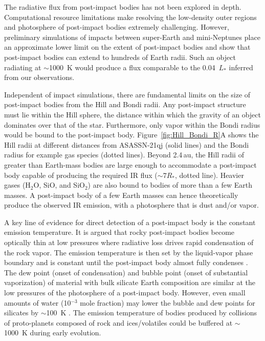 \documentclass[sn-nature]{sn-jnl}%
\begin{document}



The radiative flux from post-impact bodies has not been explored in depth.
%
Computational resource limitations make resolving the low-density outer regions and photosphere of post-impact bodies extremely challenging.
%
However, preliminary simulations of impacts between super-Earth and mini-Neptunes place an approximate lower limit on the extent of post-impact bodies and show that post-impact bodies can extend to hundreds of Earth radii.
%
Such an object radiating at $\sim$1000~K would produce a flux comparable to the 0.04~$L_*$ inferred from our observations. 

Independent of impact simulations, there are fundamental limits on the size of post-impact bodies from the Hill and Bondi radii.
%
Any post-impact structure must lie within the Hill sphere, the distance within which the gravity of an object dominates over that of the star.
%
Furthermore, only vapor within the Bondi radius would be bound to the post-impact body.
%
Figure~\ref{fig:Hill_Bondi_R}A shows the Hill radii at different distances from ASASSN-21qj (solid lines) and the Bondi radius for example gas species (dotted lines).
%
Beyond 2.4\,au, the Hill radii of greater than Earth-mass bodies are large enough to accommodate a post-impact body capable of producing the required IR flux ($\sim7R_*$, dotted line). 
%
Heavier gases (H$_2$O, SiO, and SiO$_2$) are also bound to bodies of more than a few Earth masses.
%
A post-impact body of a few Earth masses can hence theoretically produce the observed IR emission, with a photosphere that is dust and/or vapor.



A key line of evidence for direct detection of a post-impact body is the constant emission temperature.
%
It is argued \cite{Lock18} that rocky post-impact bodies become optically thin at low pressures where radiative loss drives rapid condensation of the rock vapor.
%
The emission temperature is then set by the liquid-vapor phase boundary and is constant until the post-impact body almost fully condenses \cite{Lock18,Caracas2023}.
%
The dew point (onset of condensation) and bubble point (onset of substantial vaporization) of material with bulk silicate Earth composition are similar \cite[$\sim2300$~K, within $\sim 100$~K;][]{Lock18,Fegley2023_BSE_cond} at the low pressures of the photosphere of a post-impact body.
%
However, even small amounts of water (10$^{-3}$ mole fraction) may lower the bubble and dew points for silicates by $\sim$100~K \cite[][]{Fegley2023_BSE_cond,Lock18}. 
%
The emission temperature of bodies produced by collisions of proto-planets composed of rock and ices/volatiles could be buffered at $\sim$1000~K during early evolution.
\end{document}
